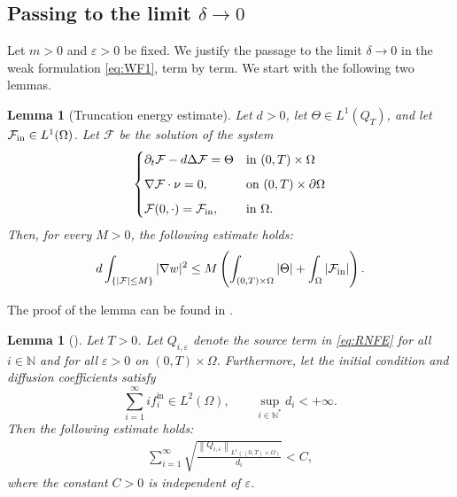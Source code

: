 \documentclass[a4paper,12pt,reqno]{amsart}
\theoremstyle{plain}
\newtheorem{lem}[thm]{Lemma}
\numberwithin{equation}{section}
\begin{document}
	\subsection{Passing to the limit \texorpdfstring{$\delta \to 0$}{delta to zero}}
	
	
	Let $m>0$ and $\varepsilon>0$ be fixed. We justify the passage to the limit
	$\delta\to0$ in the weak formulation \eqref{eq:WF1}, term by term. We start with the following two lemmas.
	\begin{lem}[Truncation energy estimate]\label{lem:trunc-energy}
		Let $d>0$, let $\Theta \in L^{1}(Q_T)$, and let $\mathcal{F}_{\rm{in}} \in L^{1}(\Omega)$.
		Let $\mathcal{F}$ be the solution of the system
		\begin{equation}\label{eq:trunc-heat}
			\begin{cases}
				\partial_t \mathcal{F} - d \Delta \mathcal{F} = \Theta & \text{in } (0,T)\times \Omega \\[2mm]
				\nabla \mathcal{F} \cdot \nu = 0, & \text{on } (0,T)\times\partial\Omega \\[2mm]
				\mathcal{F}(0,\cdot) = \mathcal{F}_{\rm{in}}, & \text{in } \Omega.
			\end{cases}
		\end{equation}
		Then, for every $M>0$, the following estimate holds:
		\begin{equation}\label{eq:trunc-energy}
			d \int_{\{|\mathcal{F}|\le M\}} |\nabla w|^2
			\le
			M\left(
			\int_{(0,T)\times\Omega} |\Theta|
			+
			\int_{\Omega} |\mathcal{F}_{\rm{in}}|
			\right).
		\end{equation}
	\end{lem}
	The proof of the lemma can be found in \cite{Pierre2010}.
	\begin{lem}[] \label{Root bound on NR operator}
		Let $T > 0$. Let $Q_{i,\varepsilon}$ denote the source term in \eqref{eq:RNFE} for all
		$i \in \mathbb{N}$ and for all $\varepsilon > 0$ on $(0,T)\times\Omega$. Furthermore, let the initial condition and diffusion coefficients satisfy
		\[
		\sum_{i=1}^{\infty} i f_i^{\mathrm{in}} \in L^2(\Omega),
		\qquad
		\sup_{i\in\mathbb{N}^*} d_i < +\infty.
		\] 
		Then the following estimate holds:
		\begin{align*}
			\sum_{i=1}^\infty \sqrt{\frac{\left\|Q_{i,\varepsilon}\right\|_{L^{1}((0,T)\times \Omega)}}{d_i}} <C,
		\end{align*}
		where the constant $C>0$ is independent of $\varepsilon$. 
	\end{lem}
\end{document}
